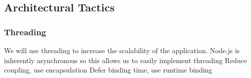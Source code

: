\subsection{Architectural Tactics}
\subsubsection{Threading}
We will use threading to increase the scalability of the application. Node.js is inherently asynchronous so this allows us to easily implement threading
Reduce coupling, use encapsulation
Defer binding time, use runtime binding